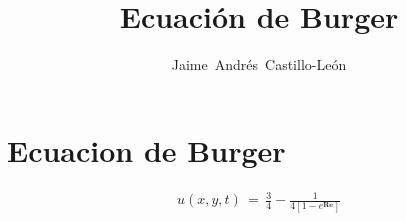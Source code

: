 \documentclass[10pt,twocolumn,twoside,technote]{ieeetran}
\title{Ecuación de Burger}
\author{Jaime~Andrés~Castillo-León}
\begin{document}
\maketitle

\section{Ecuacion de Burger}
\label{sec:ec_burg}
\begin{align}
  u(x,y,t)\,=\,\frac{3}{4}-\frac{1}{4[1-e^{\mathbf{Re}}]}
  \label{eq:vel_burg} 
\end{align}
\end{document}
